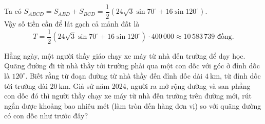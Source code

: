 \begin{bt}
{{
}
  \noindent Ta có $ S_{ABCD}=S_{ABD}+S_{BCD}=\dfrac{1}{2}\left(24\sqrt{3}\sin 70^{\circ}+16\sin 120^{\circ}\right) $.\\
   Vậy số tiền cần để lát gạch cả mảnh đất là
   $$ T=\dfrac{1}{2}\left(24\sqrt{3}\sin 70^{\circ}+16\sin 120^{\circ}\right)\cdot 400\,000 \approx 10\,583\,739 \text{ đồng}. $$
}
  
\end{bt}

\begin{bt}%
	Hằng ngày, một người thầy giáo chạy xe máy từ nhà đến trường để dạy học. Quãng đường đi từ nhà thầy tới trường phải qua một con dốc với góc ở đỉnh dốc là $120^\circ$. Biết rằng từ đoạn đường từ nhà thầy đến đỉnh dốc dài $4~\text{km}$, từ đỉnh dốc tới trường dài $20~\text{km}$. Giả sử năm 2024, người ra mở rộng đường và san phẳng con dốc đó thì người thầy chạy xe máy từ nhà đến trường trên đường mới, rút ngắn được khoảng bao nhiêu mét (làm tròn đến hàng đơn vị) so với quãng đường có con dốc như trước đây?
\end{bt}

